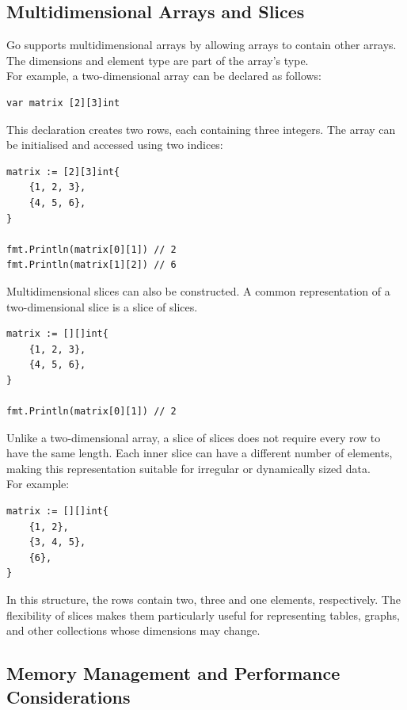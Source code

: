 \subsection{Multidimensional Arrays and Slices}

Go supports multidimensional arrays by allowing arrays to contain other arrays. The dimensions and element type are part of the array's type.\\

For example, a two-dimensional array can be declared as follows:

\begin{lstlisting}
var matrix [2][3]int
\end{lstlisting}

This declaration creates two rows, each containing three integers. The array can be initialised and accessed using two indices:

\begin{lstlisting}
matrix := [2][3]int{
    {1, 2, 3},
    {4, 5, 6},
}

fmt.Println(matrix[0][1]) // 2
fmt.Println(matrix[1][2]) // 6
\end{lstlisting}

Multidimensional slices can also be constructed. A common representation of a two-dimensional slice is a slice of slices.

\begin{lstlisting}
matrix := [][]int{
    {1, 2, 3},
    {4, 5, 6},
}

fmt.Println(matrix[0][1]) // 2
\end{lstlisting}

Unlike a two-dimensional array, a slice of slices does not require every row to have the same length. Each inner slice can have a different number of elements, making this representation suitable for irregular or dynamically sized data.\\

For example:

\begin{lstlisting}
matrix := [][]int{
    {1, 2},
    {3, 4, 5},
    {6},
}
\end{lstlisting}

In this structure, the rows contain two, three and one elements, respectively. The flexibility of slices makes them particularly useful for representing tables, graphs, and other collections whose dimensions may change.

\subsection{Memory Management and Performance Considerations}

